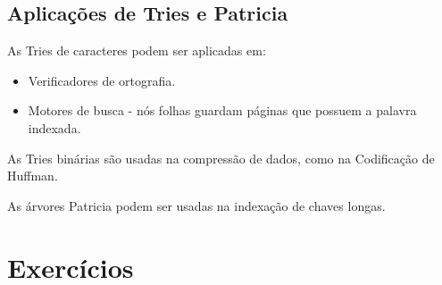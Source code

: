 \subsection{Aplicações de Tries e Patricia}

As Tries de caracteres podem ser aplicadas em:
\begin{itemize}
\item Verificadores de ortografia.
\item Motores de busca - nós folhas guardam páginas que possuem a palavra indexada.
\end{itemize}

As Tries binárias são usadas na compressão de dados, como na Codificação de Huffman.

As árvores Patricia podem ser usadas na indexação de chaves longas.

\section{Exercícios}

